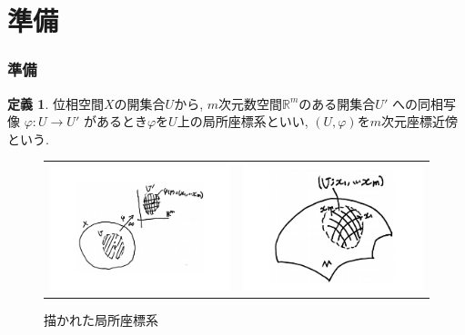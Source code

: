 \documentclass[dvipdfmx,cjk]{beamer}
\theoremstyle{definition}
\newtheorem{dfn}{\textbf{ 定義 }}
\begin{document}
\section{準備}
\begin{frame}
\frametitle{準備} 
\begin{dfn}
位相空間$X$の開集合$U$から, $m$次元数空間$\mathbb{R}^m$のある開集合$U'$
への同相写像
$\varphi : U\rightarrow U'$
があるとき$\varphi$を$U$上の局所座標系といい, 
$(U, \varphi)$を$m$次元座標近傍という. 

\end{dfn}
\begin{figure}[H]
  \begin{tabular}{cc}
    \begin{minipage}[t]{0.45\hsize}
      \centering
      \includegraphics[keepaspectratio, scale=0.2]{coNeighborhoodBig.pdf}
      \caption{$U$上の局所座標系}
      \label{}
    \end{minipage} &
    \begin{minipage}[t]{0.45\hsize}
      \centering
      \includegraphics[keepaspectratio, scale=0.2]{DrawnLocalCoSysBig.pdf}
      \caption{描かれた局所座標系}
      \label{}
    \end{minipage}
  \end{tabular}
\end{figure}
\end{frame}
\end{document}
